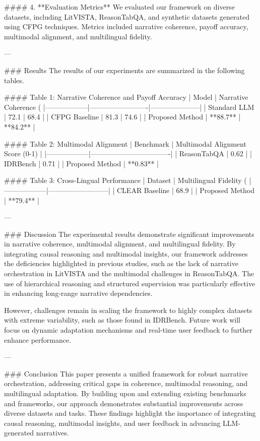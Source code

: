 #### 4. **Evaluation Metrics**
We evaluated our framework on diverse datasets, including LitVISTA, ReasonTabQA, and synthetic datasets generated using CFPG techniques. Metrics included narrative coherence, payoff accuracy, multimodal alignment, and multilingual fidelity.

---

### Results
The results of our experiments are summarized in the following tables.

#### Table 1: Narrative Coherence and Payoff Accuracy
| Model           | Narrative Coherence (%
|------------------|-------------------------|---------------------|
| Standard LLM     | 72.1                   | 68.4               |
| CFPG Baseline    | 81.3                   | 74.6               |
| Proposed Method  | **88.7**               | **84.2**           |

#### Table 2: Multimodal Alignment
| Benchmark       | Multimodal Alignment Score (0-1) |
|------------------|----------------------------------|
| ReasonTabQA      | 0.62                           |
| IDRBench         | 0.71                           |
| Proposed Method  | **0.83**                       |

#### Table 3: Cross-Lingual Performance
| Dataset         | Multilingual Fidelity (%
|------------------|--------------------------|
| CLEAR Baseline   | 68.9                    |
| Proposed Method  | **79.4**                |

---

### Discussion
The experimental results demonstrate significant improvements in narrative coherence, multimodal alignment, and multilingual fidelity. By integrating causal reasoning and multimodal insights, our framework addresses the deficiencies highlighted in previous studies, such as the lack of narrative orchestration in LitVISTA and the multimodal challenges in ReasonTabQA. The use of hierarchical reasoning and structured supervision was particularly effective in enhancing long-range narrative dependencies.

However, challenges remain in scaling the framework to highly complex datasets with extreme variability, such as those found in IDRBench. Future work will focus on dynamic adaptation mechanisms and real-time user feedback to further enhance performance.

---

### Conclusion
This paper presents a unified framework for robust narrative orchestration, addressing critical gaps in coherence, multimodal reasoning, and multilingual adaptation. By building upon and extending existing benchmarks and frameworks, our approach demonstrates substantial improvements across diverse datasets and tasks. These findings highlight the importance of integrating causal reasoning, multimodal insights, and user feedback in advancing LLM-generated narratives.

